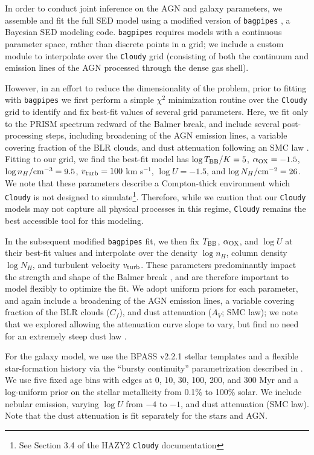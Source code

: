 \documentclass[twocolumn]{aastex7}
\begin{document}
In order to conduct joint inference on the AGN and galaxy parameters, we assemble and fit the full SED model using a modified version of \texttt{bagpipes} \citep{carnall18}, a Bayesian SED modeling code. 
\texttt{bagpipes} requires models with a continuous parameter space, rather than discrete points in a grid; we include a custom module to interpolate over the \texttt{Cloudy} grid (consisting of both the continuum and emission  lines of the AGN processed through the dense gas shell). 

However, in an effort to reduce the dimensionality of the problem, prior to fitting with \texttt{bagpipes} we first perform a simple $\chi^2$ minimization routine over the \texttt{Cloudy} grid to identify and fix best-fit values of several grid parameters. 
Here, we fit only to the PRISM spectrum redward of the Balmer break, and include several post-processing steps, including broadening of the AGN emission lines, a variable covering fraction of the BLR clouds, and dust attenuation following an SMC law \citep{gordon03}.
Fitting to our grid, we find the best-fit model has $\log T_{\rm BB}/K = 5$, $\alpha_{\rm OX} = -1.5$, $\log n_H/{\rm cm}^{-3} = 9.5$, $v_{\rm turb} = 100$ km s$^{-1}$, $\log U = -1.5$, and $\log N_H/{\rm cm}^{-2} = 26$. We note that these parameters describe a Compton-thick environment which \texttt{Cloudy} is not designed to simulate\footnote{See Section 3.4 of the HAZY2 \texttt{Cloudy} documentation}. Therefore, while we caution that our \texttt{Cloudy} models may not capture all physical processes in this regime, \texttt{Cloudy} remains the best accessible tool for this modeling.

In the subsequent modified \texttt{bagpipes} fit, we then fix $T_{\rm BB}$, $\alpha_{\rm OX}$, and $\log U$ at their best-fit values and interpolate over the density $\log n_H$, column density $\log N_H$, and turbulent velocity $v_{\rm turb}$. 
These parameters predominantly impact the strength and shape of the Balmer break \citep[see][]{ji25}, and are therefore important to model flexibly to optimize the fit. 
We adopt uniform priors for each parameter, and again include a broadening of the AGN emission lines, a variable covering fraction of the BLR clouds ($C_f$), and dust attenuation ($A_V$; SMC law); we note that we explored allowing the attenuation curve slope to vary, but find no need for an extremely steep dust law \citep[in contrast to][]{degraaff25}. 

For the galaxy model, we use the BPASS v2.2.1 stellar templates \citep{bpass221} and a flexible star-formation history via the ``bursty continuity'' parametrization described in \citet{tacchella22}. We use five fixed age bins with edges at 0, 10, 30, 100, 200, and 300 Myr and a log-uniform prior on the stellar metallicity from 0.1\% to 100\% solar. We include nebular emission, varying $\log U$ from $-4$ to $-1$, and dust attenuation (SMC law). Note that the dust attenuation is fit separately for the stars and AGN. 
\end{document}
